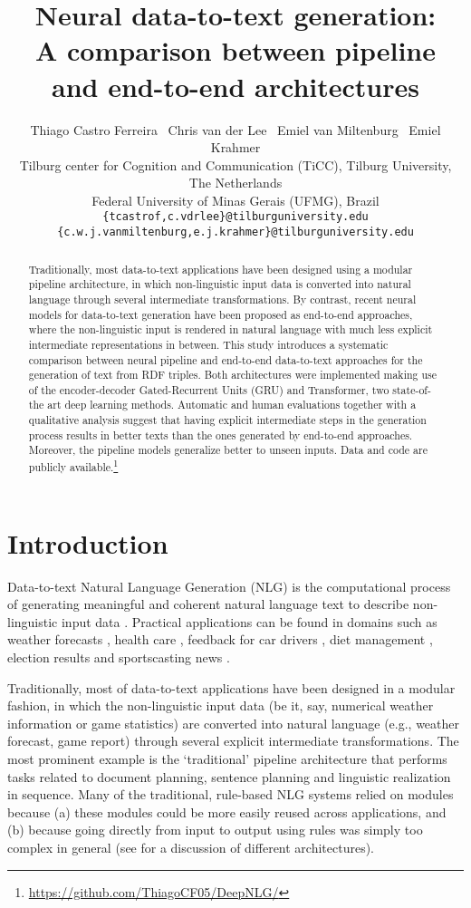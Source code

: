 \documentclass[11pt,a4paper]{article}
\title{Neural data-to-text generation: \\ 
A comparison between pipeline and end-to-end architectures}
\author{Thiago Castro Ferreira \, Chris van der Lee \, Emiel van Miltenburg \, Emiel Krahmer \\ 
         Tilburg center for Cognition and Communication (TiCC), Tilburg University, The Netherlands \\
         Federal University of Minas Gerais (UFMG), Brazil \\
         {\tt \{tcastrof,c.vdrlee\}@tilburguniversity.edu} \\
         {\tt \{c.w.j.vanmiltenburg,e.j.krahmer\}@tilburguniversity.edu}}
\date{}
\begin{document}
\maketitle
\begin{abstract}
  
  Traditionally, most data-to-text applications have been designed using a modular pipeline architecture, in which non-linguistic input data is converted into natural language through several intermediate transformations. By contrast, recent neural models for data-to-text generation have been proposed as end-to-end approaches, where the non-linguistic input is rendered in natural language with much less explicit intermediate representations in between. This study introduces a systematic comparison between neural pipeline and end-to-end data-to-text approaches for the generation of text from RDF triples. Both architectures were implemented making use of the encoder-decoder Gated-Recurrent Units (GRU) and Transformer, two state-of-the art deep learning methods. Automatic and human evaluations together with a qualitative analysis suggest that having explicit intermediate steps in the generation process results in better texts than the ones generated by end-to-end approaches. Moreover, the pipeline models generalize better to unseen inputs. Data and code are  publicly available.\footnote{\url{https://github.com/ThiagoCF05/DeepNLG/}}
  
\end{abstract}



\section{Introduction}

Data-to-text Natural Language Generation (NLG) is the computational process of generating meaningful and coherent natural language text to describe non-linguistic input data \cite{gatt2017}. Practical applications can be found in domains such as weather forecasts \citep{mei2016}, health care \citep{portet2009}, feedback for car drivers \citep{braun2018}, diet management \cite{mazzei2018}, election results \citep{leo2017} and sportscasting news \citep{chris2017}.

Traditionally, most of data-to-text applications have been designed in a modular fashion, in which the non-linguistic input data (be it, say, numerical weather information or game statistics) are converted into natural language (e.g., weather forecast, game report) through several explicit intermediate transformations. The most prominent example is the `traditional' pipeline architecture \citep{reiter2000} that performs tasks related to document planning, sentence planning and linguistic realization in sequence. 
Many of the traditional, rule-based NLG systems relied on modules because (a) these modules could be more easily reused across applications, and (b) because going directly from input to output using rules was simply too complex in general (see \citealt{gatt2017} for a discussion of different architectures). 
\end{document}
